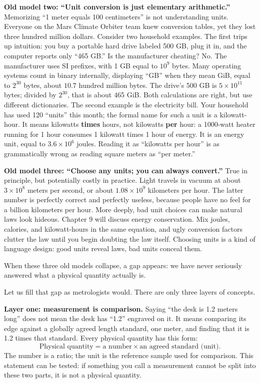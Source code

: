 \textbf{Old model two: ``Unit conversion is just elementary arithmetic.''} Memorizing ``1 meter equals 100 centimeters'' is not understanding units. Everyone on the Mars Climate Orbiter team knew conversion tables, yet they lost three hundred million dollars. Consider two household examples. The first trips up intuition: you buy a portable hard drive labeled 500 GB, plug it in, and the computer reports only ``465 GB.'' Is the manufacturer cheating? No. The manufacturer uses SI prefixes, with 1 GB equal to $10^9$ bytes. Many operating systems count in binary internally, displaying ``GB'' when they mean GiB, equal to $2^{30}$ bytes, about $10.7$ hundred million bytes. The drive's 500 GB is $5\times10^{11}$ bytes; divided by $2^{30}$, that is about 465 GiB. Both calculations are right, but use different dictionaries. The second example is the electricity bill. Your household has used 120 ``units'' this month; the formal name for such a unit is a kilowatt-hour. It means kilowatts \textbf{times} hours, not kilowatts \textbf{per} hour: a 1000-watt heater running for 1 hour consumes 1 kilowatt times 1 hour of energy. It is an energy unit, equal to $3.6\times10^6$ joules. Reading it as ``kilowatts per hour'' is as grammatically wrong as reading square meters as ``per meter.''

\textbf{Old model three: ``Choose any units; you can always convert.''} True in principle, but potentially costly in practice. Light travels in vacuum at about $3\times10^8$ meters per second, or about $1.08\times10^9$ kilometers per hour. The latter number is perfectly correct and perfectly useless, because people have no feel for a billion kilometers per hour. More deeply, bad unit choices can make natural laws look hideous. Chapter 9 will discuss energy conservation. Mix joules, calories, and kilowatt-hours in the same equation, and ugly conversion factors clutter the law until you begin doubting the law itself. Choosing units is a kind of language design: good units reveal laws, bad units conceal them.

When these three old models collapse, a gap appears: we have never seriously answered what a physical quantity actually is.


Let us fill that gap as metrologists would. There are only three layers of concepts.

\textbf{Layer one: measurement is comparison.} Saying ``the desk is 1.2 meters long'' does not mean the desk has ``1.2'' engraved on it. It means comparing its edge against a globally agreed length standard, one meter, and finding that it is 1.2 times that standard. Every physical quantity has this form:
\[
\text{Physical quantity} = \text{a number} \times \text{an agreed standard (unit)}.
\]
The number is a ratio; the unit is the reference sample used for comparison. This statement can be tested: if something you call a measurement cannot be split into these two parts, it is not a physical quantity.

